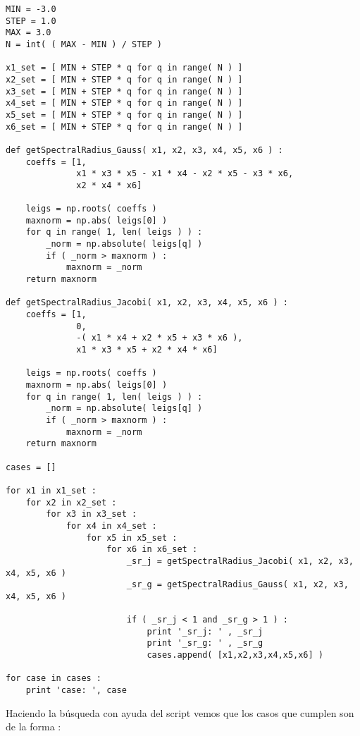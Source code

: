 \documentclass{article}
\begin{document}
\begin{enumerate}
\begin{lstlisting}[frame=single]
MIN = -3.0
STEP = 1.0
MAX = 3.0
N = int( ( MAX - MIN ) / STEP )

x1_set = [ MIN + STEP * q for q in range( N ) ]
x2_set = [ MIN + STEP * q for q in range( N ) ]
x3_set = [ MIN + STEP * q for q in range( N ) ]
x4_set = [ MIN + STEP * q for q in range( N ) ]
x5_set = [ MIN + STEP * q for q in range( N ) ]
x6_set = [ MIN + STEP * q for q in range( N ) ]

def getSpectralRadius_Gauss( x1, x2, x3, x4, x5, x6 ) :
    coeffs = [1, 
              x1 * x3 * x5 - x1 * x4 - x2 * x5 - x3 * x6,
              x2 * x4 * x6]

    leigs = np.roots( coeffs )
    maxnorm = np.abs( leigs[0] )
    for q in range( 1, len( leigs ) ) :
        _norm = np.absolute( leigs[q] )
        if ( _norm > maxnorm ) :
            maxnorm = _norm
    return maxnorm

def getSpectralRadius_Jacobi( x1, x2, x3, x4, x5, x6 ) :
    coeffs = [1,
              0, 
              -( x1 * x4 + x2 * x5 + x3 * x6 ),
              x1 * x3 * x5 + x2 * x4 * x6]

    leigs = np.roots( coeffs )
    maxnorm = np.abs( leigs[0] )
    for q in range( 1, len( leigs ) ) :
        _norm = np.absolute( leigs[q] )
        if ( _norm > maxnorm ) :
            maxnorm = _norm
    return maxnorm

cases = []

for x1 in x1_set :
    for x2 in x2_set :
        for x3 in x3_set :
            for x4 in x4_set :
                for x5 in x5_set :
                    for x6 in x6_set :
                        _sr_j = getSpectralRadius_Jacobi( x1, x2, x3, x4, x5, x6 )
                        _sr_g = getSpectralRadius_Gauss( x1, x2, x3, x4, x5, x6 )
                        
                        if ( _sr_j < 1 and _sr_g > 1 ) :
                            print '_sr_j: ' , _sr_j
                            print '_sr_g: ' , _sr_g
                            cases.append( [x1,x2,x3,x4,x5,x6] )

for case in cases :
    print 'case: ', case
\end{lstlisting}
Haciendo la b\'usqueda con ayuda del script vemos que los casos que cumplen son de la forma :


\end{enumerate}
\end{document}
